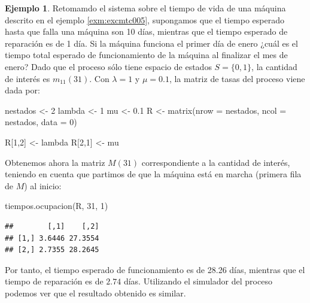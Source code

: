 \documentclass[
]{book}
\newenvironment{Shaded}{\begin{snugshade}}{\end{snugshade}}
\newcommand{\AttributeTok}[1]{\textcolor[rgb]{0.77,0.63,0.00}{#1}}
\newcommand{\DecValTok}[1]{\textcolor[rgb]{0.00,0.00,0.81}{#1}}
\newcommand{\FloatTok}[1]{\textcolor[rgb]{0.00,0.00,0.81}{#1}}
\newcommand{\FunctionTok}[1]{\textcolor[rgb]{0.00,0.00,0.00}{#1}}
\newcommand{\NormalTok}[1]{#1}
\newcommand{\OtherTok}[1]{\textcolor[rgb]{0.56,0.35,0.01}{#1}}
\theoremstyle{definition}
\theoremstyle{definition}
\newtheorem{example}{Ejemplo}[chapter]
\theoremstyle{definition}
\theoremstyle{definition}
\theoremstyle{remark}
\begin{document}
\begin{example}
Retomamdo el sistema sobre el tiempo de vida de una máquina descrito en el ejemplo \ref{exm:excmtc005}, supongamos que el tiempo esperado hasta que falla una máquina son 10 días, mientras que el tiempo esperado de reparación es de 1 día. Si la máquina funciona el primer día de enero ¿cuál es el tiempo total esperado de funcionamiento de la máquina al finalizar el mes de enero? Dado que el proceso sólo tiene espacio de estados \(S = \{0, 1\}\), la cantidad de interés es \(m_{11}(31)\). Con \(\lambda = 1\) y \(\mu = 0.1\), la matriz de tasas del proceso viene dada por:
\end{example}

\begin{Shaded}
\begin{Highlighting}[]
\NormalTok{nestados }\OtherTok{\textless{}{-}} \DecValTok{2}
\NormalTok{lambda }\OtherTok{\textless{}{-}} \DecValTok{1}
\NormalTok{mu }\OtherTok{\textless{}{-}} \FloatTok{0.1}
\NormalTok{R }\OtherTok{\textless{}{-}} \FunctionTok{matrix}\NormalTok{(}\AttributeTok{nrow =}\NormalTok{ nestados, }\AttributeTok{ncol =}\NormalTok{ nestados, }\AttributeTok{data =} \DecValTok{0}\NormalTok{)}

\NormalTok{R[}\DecValTok{1}\NormalTok{,}\DecValTok{2}\NormalTok{] }\OtherTok{\textless{}{-}}\NormalTok{ lambda }
\NormalTok{R[}\DecValTok{2}\NormalTok{,}\DecValTok{1}\NormalTok{] }\OtherTok{\textless{}{-}}\NormalTok{ mu }
\end{Highlighting}
\end{Shaded}

Obtenemos ahora la matriz \(M(31)\) correspondiente a la cantidad de interés, teniendo en cuenta que partimos de que la máquina está en marcha (primera fila de \(M\)) al inicio:

\begin{Shaded}
\begin{Highlighting}[]
\FunctionTok{tiempos.ocupacion}\NormalTok{(R, }\DecValTok{31}\NormalTok{, }\DecValTok{1}\NormalTok{)}
\end{Highlighting}
\end{Shaded}

\begin{verbatim}
##        [,1]    [,2]
## [1,] 3.6446 27.3554
## [2,] 2.7355 28.2645
\end{verbatim}

Por tanto, el tiempo esperado de funcionamiento es de 28.26 días, mientras que el tiempo de reparación es de \(2.74\) días. Utilizando el simulador del proceso podemos ver que el resultado obtenido es similar.
\end{document}
